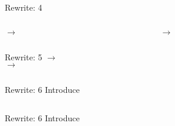 \begin{frame}{Rewrite: 4}
  \begin{columns}
    \begin{column}{0.5\textwidth}
      \colorbox{pink!30}{ $\to$ }
      
      \usebox\typecaseDbox
    \end{column}
    \begin{column}{0.5\textwidth}  %
      \colorbox{pink!30}{ $\to$ }

      \usebox\typecaseEhbox
    \end{column}    
  \end{columns}
\end{frame}

\begin{frame}{Rewrite: 5}
  \colorbox{pink!30}{ $\to$ }\\
  \colorbox{pink!30}{ $\to$ }

  \begin{columns}
    \begin{column}{0.5\textwidth}
      \usebox\typecaseEbox
    \end{column}
    \begin{column}{0.5\textwidth}  %
      \usebox\typecaseFhbox
    \end{column}    
  \end{columns}
\end{frame}

\begin{frame}{Rewrite: 6}
  Introduce \colorbox{pink!30}{}

  \begin{columns}
    \begin{column}{0.5\textwidth}
      \usebox\typecaseFbox
    \end{column}
    \begin{column}{0.5\textwidth}  %
      \usebox\typecaseGabox
    \end{column}    
  \end{columns}
\end{frame}

\begin{frame}{Rewrite: 6}
  Introduce \colorbox{pink!30}{}

  \begin{columns}
    \begin{column}{0.5\textwidth}
      \usebox\typecaseFbox
    \end{column}
    \begin{column}{0.5\textwidth}  %
      \usebox\typecaseGbox
    \end{column}    
  \end{columns}
\end{frame}

